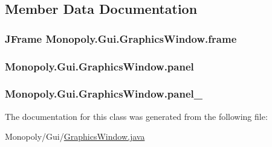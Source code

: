 \subsection{Member Data Documentation}
\subsubsection[{\texorpdfstring{frame}{frame}}]{\setlength{\rightskip}{0pt plus 5cm}J\+Frame Monopoly.\+Gui.\+Graphics\+Window.\+frame\hspace{0.3cm}{\ttfamily [private]}}\hypertarget{class_monopoly_1_1_gui_1_1_graphics_window_ab43b42c7612644a1ba7c4386cc744ec6}{}\label{class_monopoly_1_1_gui_1_1_graphics_window_ab43b42c7612644a1ba7c4386cc744ec6}
\subsubsection[{\texorpdfstring{panel}{panel}}]{ Monopoly.\+Gui.\+Graphics\+Window.\+panel\hspace{0.3cm}{\ttfamily [private]}}\hypertarget{class_monopoly_1_1_gui_1_1_graphics_window_ae8c4d8f340754454eb9297e23614157f}{}\label{class_monopoly_1_1_gui_1_1_graphics_window_ae8c4d8f340754454eb9297e23614157f}
\subsubsection[{\texorpdfstring{panel\+\_\+1}{panel_1}}]{ Monopoly.\+Gui.\+Graphics\+Window.\+panel\+\_\hspace{0.3cm}{\ttfamily [private]}}\hypertarget{class_monopoly_1_1_gui_1_1_graphics_window_a402bbb6f51be8880740cbf75c9a830d5}{}\label{class_monopoly_1_1_gui_1_1_graphics_window_a402bbb6f51be8880740cbf75c9a830d5}


The documentation for this class was generated from the following file\+:\begin{DoxyCompactItemize}
\item 
Monopoly/\+Gui/\hyperlink{_graphics_window_8java}{Graphics\+Window.\+java}\end{DoxyCompactItemize}
